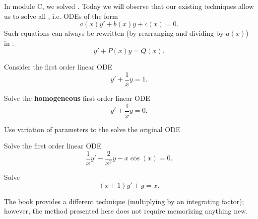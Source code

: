 \begin{applicationActivities}

\begin{observation}
In module C, we solved .
\vfill
Today we will observe that our existing techniques allow us to solve all , i.e. ODEs of the form
\[a(x)y'+b(x)y+c(x)=0.\]
Such equations can always be rewritten (by rearranging and dividing by \(a(x)\)) in :
\[y'+P(x)y=Q(x).\]
\end{observation}

\begin{activity}{20}
Consider the first order linear ODE \[y'+\frac{1}{x}y=1.\]
\begin{subactivity}
Solve the \textbf{homogeneous} first order linear ODE \[y'+\frac{1}{x}y=0.\]
\end{subactivity}
\begin{subactivity}
Use variation of parameters to the solve the original ODE
\end{subactivity}
\end{activity}

\begin{activity}{15}
Solve the first order linear ODE \[\frac{1}{x}y'-\frac{2}{x^2}y-x\cos(x) = 0.\]
\end{activity}

\begin{activity}{15}
Solve 
\[ (x+1)y'+y=x.\]
\end{activity}

\begin{remark}
The book provides a different technique (multiplying by an integrating factor); however, the method presented here does not require memorizing anything new.
\end{remark}



\end{applicationActivities}
